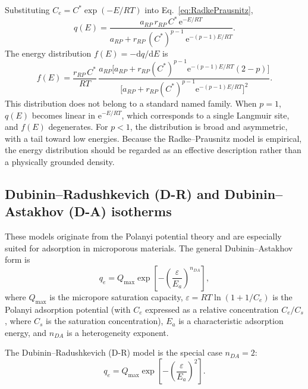 	Substituting $C_e = C^{\ast}\exp(-E/RT)$ into
	Eq.~\eqref{eq:RadkePrausnitz},
	\begin{equation}
		q(E)
		= \frac{a_{RP}\, r_{RP}\, C^{\ast}\,\mathrm{e}^{-E/RT}}
		{a_{RP} + r_{RP}\,(C^{\ast})^{p-1}\,
		\mathrm{e}^{-(p-1)E/RT}}.
		\label{eq:qE_RadkePrausnitz}
	\end{equation}
	The energy distribution $f(E) = -\mathrm{d}q/\mathrm{d}E$ is
	\begin{equation}
		f(E) = \frac{r_{RP}\,C^{\ast}}{RT}\,
		\frac{a_{RP}\bigl[a_{RP} + r_{RP}(C^{\ast})^{p-1}
		\mathrm{e}^{-(p-1)E/RT}(2-p)\bigr]}
		{\bigl[a_{RP} + r_{RP}(C^{\ast})^{p-1}
		\mathrm{e}^{-(p-1)E/RT}\bigr]^{2}}.
		\label{eq:fE_RadkePrausnitz}
	\end{equation}
	This distribution does not belong to a standard named family.
	When $p = 1$, $q(E)$ becomes linear in $\mathrm{e}^{-E/RT}$,
	which corresponds to a single Langmuir site, and $f(E)$ degenerates.
	For $p < 1$, the distribution is broad and asymmetric, with a tail
	toward low energies.  Because the Radke--Prausnitz model is
	empirical, the energy distribution should be regarded as an
	effective description rather than a physically grounded density.

	\subsection{Dubinin--Radushkevich (D-R) and Dubinin--Astakhov (D-A) isotherms}

	These models originate from the Polanyi potential theory and are
	especially suited for adsorption in microporous materials.  The
	general Dubinin--Astakhov form is
	\begin{equation}
		q_e = Q_{\max} \exp\!\left[
		-\left(\frac{\varepsilon}{E_a}\right)^{\!n_{DA}}
		\right],
		\label{eq:DA}
	\end{equation}
	where $Q_{\max}$ is the micropore saturation capacity,
	$\varepsilon = RT\ln(1 + 1/C_e)$ is the Polanyi adsorption
	potential (with $C_e$ expressed as a relative concentration
	$C_e/C_s$, where $C_s$ is the saturation concentration),
	$E_a$ is a characteristic adsorption energy, and $n_{DA}$ is
	a heterogeneity exponent.

	The Dubinin--Radushkevich (D-R) model is the special case $n_{DA} = 2$:
	\begin{equation}
		q_e = Q_{\max} \exp\!\left[
		-\left(\frac{\varepsilon}{E_a}\right)^{\!2}
		\right].
		\label{eq:DR}
	\end{equation}

